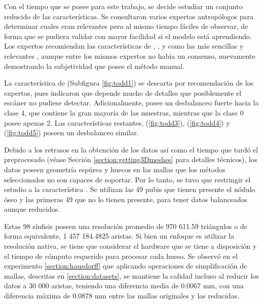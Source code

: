 Con el tiempo que se posee para este trabajo, se decide estudiar un conjunto reducido de las características. Se consultaron varios expertos antropólogos para determinar cuales eran relevantes pero al mismo tiempo fáciles de observar, de forma que se pudiera validar con mayor facilidad si el modelo está aprendiendo. Los expertos recomiendan las características de , ,  y  como las más sencillas y relevantes \cite{granados}, aunque entre los mismos expertos no había un consenso, nuevamente demostrando la subjetividad que posee el método manual.

La característica de  (Subfigura \ref{fig:todd1}) se descarta por recomendación de los expertos, pues indicaron que depende mucho de detalles que posiblemente el escáner no pudiese detectar. Adicionalmente, posee un desbalanceo fuerte hacia la clase 4, que contiene la gran mayoría de las muestras, mientras que la clase 0 posee apenas 2. Las características restantes,  (\ref{fig:todd3}),  (\ref{fig:todd4}) y  (\ref{fig:todd5}) poseen un desbalanceo similar.


Debido a los retrasos en la obtención de los datos así como el tiempo que tardó el preprocesado (véase Sección \ref{section:getting3Dmeshes} para detalles técnicos), los datos poseen geometría espúrea y huecos en las mallas que los métodos seleccionados no son capaces de soportar. Por lo tanto, se tuvo que restringir el estudio a la característica . Se utilizan las 49 pubis que tienen presente el nódulo óseo y las primeras 49 que no lo tienen presente, para tener datos balanceados aunque reducidos. 

Estas 98 sínfisis poseen una resolución promedio de 970 611.59 triángulos o de forma equivalente, 1 457 184.4825 aristas. Si bien un enfoque es utilizar la resolución nativa, se tiene que considerar el hardware que se tiene a disposición y el tiempo de cómputo requerido para procesar cada hueso. Se observó en el experimento \ref{section:hausdorff} que aplicando operaciones de simplificación de mallas, descritas en \ref{section:datasets}, se mantiene la calidad incluso al reducir los datos a 30 000 aristas, teniendo una diferencia media de 0.0067 mm, con una diferencia máxima de 0.0878 mm entre las mallas originales y las reducidas.

